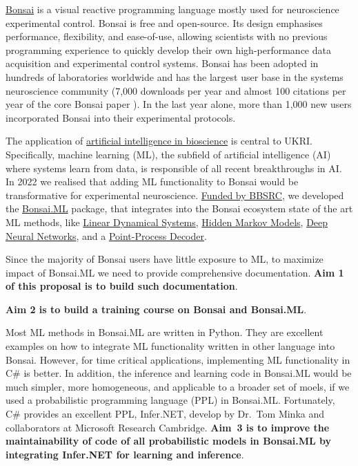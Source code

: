 \href{https://bonsai-rx.org/}{Bonsai} is a visual reactive programming language
mostly used for neuroscience experimental control.
%
Bonsai is free and open-source.  Its design emphasises performance,
flexibility, and ease-of-use, allowing scientists with no previous programming
experience to quickly develop their own high-performance data acquisition and
experimental control systems.
%
Bonsai has been adopted in hundreds of laboratories worldwide and has the
largest user base in the systems neuroscience community (7,000 downloads per
year and almost 100 citations per year of the core Bonsai paper
\citep{lopesEtAl15}). In the last year alone, more than 1,000 new users
incorporated Bonsai into their experimental protocols.

The application of
\href{https://www.ukri.org/what-we-do/browse-our-areas-of-investment-and-support/artificial-intelligence-in-bioscience/}{artificial
intelligence in bioscience} is central to UKRI.
%
Specifically, machine learning (ML), the subfield of artificial intelligence
(AI) where systems learn from data, is responsible of all recent breakthroughs
in AI.
%
In 2022 we realised that adding ML functionality to Bonsai would be
transformative for experimental neuroscience.
\href{https://gow.bbsrc.ukri.org/grants/AwardDetails.aspx?FundingReference=BB\%2FW019132\%2F1}{Funded
by BBSRC}, we developed the
\href{https://bonsai-rx.org/machinelearning/}{Bonsai.ML} package, that
integrates into the Bonsai ecosystem state of the art ML methods, like
\href{https://bonsai-rx.org/machinelearning/examples/examples/LinearDynamicalSystems/README.html}{Linear
Dynamical Systems},
\href{https://bonsai-rx.org/machinelearning/examples/examples/HiddenMarkovModels/README.html}{Hidden
Markov Models},
\href{https://bonsai-rx.org/machinelearning/examples/examples/Torch/NeuralNetsTrainedOnline/README.html}{Deep
Neural Networks}, and a
\href{https://bonsai-rx.org/machinelearning/examples/examples/PointProcessDecoder/DecodePositionFromHippocampusSortedUnits/README.html}{Point-Process
Decoder}.

Since the majority of Bonsai users have little exposure to ML, to
maximize impact of Bonsai.ML we need to provide comprehensive documentation.
\textbf{Aim 1 of this proposal is to build such documentation}.

\textbf{Aim 2 is to build a training course on Bonsai and Bonsai.ML}.

Most ML methods in Bonsai.ML are written in Python. They are excellent examples
on how to integrate ML functionality written in other language into Bonsai.
%
However, for time critical applications, implementing ML functionality in C\#
is better.
%
In addition, the inference and learning code in Bonsai.ML would be much
simpler, more homogeneous, and applicable to a broader set of moels, if we used
a probabilistic programming language (PPL) in Bonsai.ML.
%
Fortunately, C\# provides an excellent PPL, Infer.NET, develop by Dr.~Tom Minka
and collaborators at Microsoft Research Cambridge. \textbf{Aim~3 is to improve
the maintainability of code of all probabilistic models in Bonsai.ML by
integrating Infer.NET for learning and inference}.

